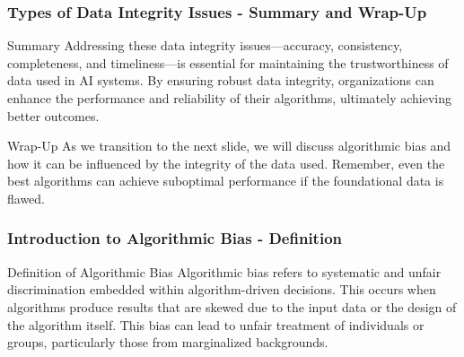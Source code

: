 \documentclass{beamer}
\begin{document}
\begin{frame}[fragile]
    \frametitle{Types of Data Integrity Issues - Summary and Wrap-Up}
    
    \begin{block}{Summary}
        Addressing these data integrity issues—accuracy, consistency, completeness, and timeliness—is essential for maintaining the trustworthiness of data used in AI systems. 
        By ensuring robust data integrity, organizations can enhance the performance and reliability of their algorithms, ultimately achieving better outcomes.
    \end{block}

    \begin{block}{Wrap-Up}
        As we transition to the next slide, we will discuss algorithmic bias and how it can be influenced by the integrity of the data used. 
        Remember, even the best algorithms can achieve suboptimal performance if the foundational data is flawed.
    \end{block}
\end{frame}

\begin{frame}[fragile]
    \frametitle{Introduction to Algorithmic Bias - Definition}
    \begin{block}{Definition of Algorithmic Bias}
        Algorithmic bias refers to systematic and unfair discrimination embedded within algorithm-driven decisions. This occurs when algorithms produce results that are skewed due to the input data or the design of the algorithm itself. This bias can lead to unfair treatment of individuals or groups, particularly those from marginalized backgrounds.
    \end{block}
\end{frame}
\end{document}
